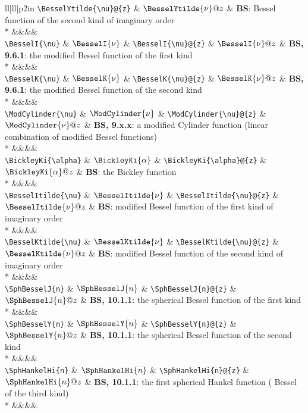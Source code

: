 \begin{supertabular}{ll|ll|p{2in}}
\verb~\BesselYtilde{\nu}@{z}~ & $\BesselYtilde{\nu}@{z}$ & 
\textbf{BS}: Bessel function of the second kind of imaginary order\\*
&&&&\\[-1ex]
\verb~\BesselI{\nu}~ & $\BesselI{\nu}$ & 
\verb~\BesselI{\nu}@{z}~ & $\BesselI{\nu}@{z}$ & 
\textbf{BS, 9.6.1}: the modified Bessel function of the first kind\\*
&&&&\\[-1ex]
\verb~\BesselK{\nu}~ & $\BesselK{\nu}$ & 
\verb~\BesselK{\nu}@{z}~ & $\BesselK{\nu}@{z}$ & 
\textbf{BS, 9.6.1}: the modified Bessel function of the second kind\\*
&&&&\\[-1ex]
\verb~\ModCylinder{\nu}~ & $\ModCylinder{\nu}$ & 
\verb~\ModCylinder{\nu}@{z}~ & $\ModCylinder{\nu}@{z}$ & 
\textbf{BS, 9.x.x}: a modified Cylinder function (linear combination of modified Bessel functions)\\*
&&&&\\[-1ex]
\verb~\BickleyKi{\alpha}~ & $\BickleyKi{\alpha}$ & 
\verb~\BickleyKi{\alpha}@{z}~ & $\BickleyKi{\alpha}@{z}$ & 
\textbf{BS}: the Bickley function\\*
&&&&\\[-1ex]
\verb~\BesselItilde{\nu}~ & $\BesselItilde{\nu}$ & 
\verb~\BesselItilde{\nu}@{z}~ & $\BesselItilde{\nu}@{z}$ & 
\textbf{BS}: modified Bessel function of the first kind of imaginary order\\*
&&&&\\[-1ex]
\verb~\BesselKtilde{\nu}~ & $\BesselKtilde{\nu}$ & 
\verb~\BesselKtilde{\nu}@{z}~ & $\BesselKtilde{\nu}@{z}$ & 
\textbf{BS}: modified Bessel function of the second kind of imaginary order\\*
&&&&\\[-1ex]
\verb~\SphBesselJ{n}~ & $\SphBesselJ{n}$ & 
\verb~\SphBesselJ{n}@{z}~ & $\SphBesselJ{n}@{z}$ & 
\textbf{BS, 10.1.1}: the spherical Bessel function of the first kind\\*
&&&&\\[-1ex]
\verb~\SphBesselY{n}~ & $\SphBesselY{n}$ & 
\verb~\SphBesselY{n}@{z}~ & $\SphBesselY{n}@{z}$ & 
\textbf{BS, 10.1.1}: the spherical Bessel function of the second kind\\*
&&&&\\[-1ex]
\verb~\SphHankelHi{n}~ & $\SphHankelHi{n}$ & 
\verb~\SphHankelHi{n}@{z}~ & $\SphHankelHi{n}@{z}$ & 
\textbf{BS, 10.1.1}: the first spherical Hankel function ( Bessel of the third kind)\\*
&&&&\\[-1ex]

\end{supertabular}
